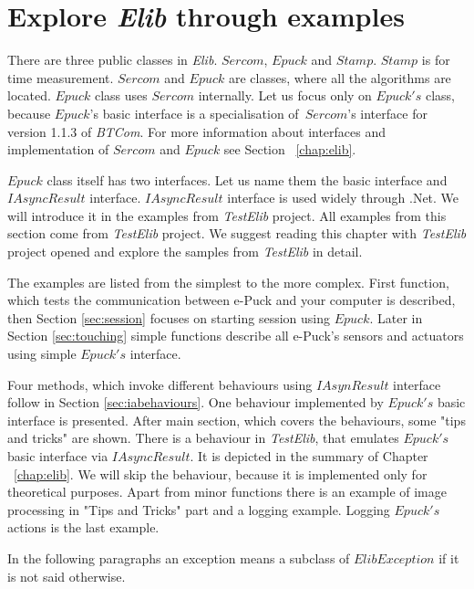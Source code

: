\section{Explore {\it Elib} through examples} \label{sec:interfaces}
  There are three public classes in {\it Elib}. $Sercom$, $Epuck$ and $Stamp$.
  $Stamp$ is for time measurement. $Sercom$ and $Epuck$ are classes, where all the algorithms are located.
  $Epuck$ class uses $Sercom$ internally.
  Let us focus only on $Epuck's$ class, because $Epuck$'s basic interface is a specialisation of~$Sercom$'s
  interface for version 1.1.3 of {\it BTCom}.
  For more information about interfaces and implementation of $Sercom$ and $Epuck$ see Section ~\ref{chap:elib}.

  $Epuck$ class itself has two interfaces. Let us name them the basic interface and $IAsyncResult$ interface.
  $IAsyncResult$ interface is used widely through .Net. We will introduce it in the examples from {\it TestElib} project.
  All examples from this section come from {\it TestElib} project. We suggest reading this chapter with {\it TestElib} project opened
  and explore the samples from {\it TestElib} in detail.


  The examples are listed from the simplest to the more complex. 
  First function, which tests the communication between e-Puck and your computer is described,
  then Section \ref{sec:session} focuses on starting session using $Epuck$.
  Later in Section \ref{sec:touching} simple functions describe all e-Puck's sensors and actuators using simple $Epuck's$ interface.
  
  Four methods, which invoke different behaviours using $IAsynResult$ 
  interface follow in Section \ref{sec:iabehaviours}.
  One behaviour implemented by $Epuck's$ basic interface is presented.
  After main section, which covers the behaviours, some "tips and tricks" are shown.
  There is a behaviour in {\it TestElib}, that emulates $Epuck's$ basic interface via $IAsyncResult$. 
  It is depicted in the summary of Chapter ~\ref{chap:elib}.
  We will skip the behaviour, because it is implemented only for theoretical purposes.
  Apart from minor functions there is an example of image processing in "Tips and Tricks" part and a logging example.
  Logging $Epuck's$ actions is the last example.
  \begin{remark}
  In the following paragraphs an exception means a subclass of $ElibException$ if it is not said otherwise.
  \end{remark}
    
